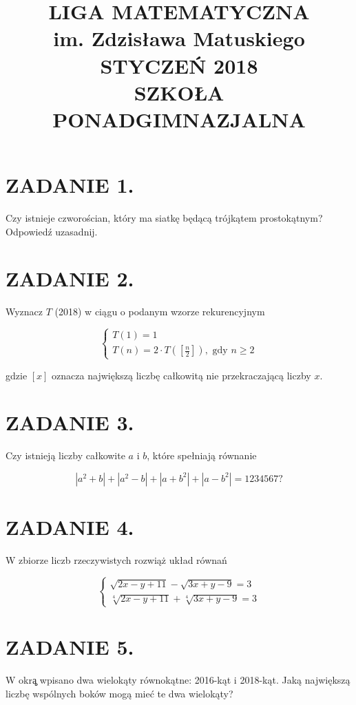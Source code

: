 \documentclass[10pt]{article}
\title{LIGA MATEMATYCZNA \\
 im. Zdzisława Matuskiego \\
 STYCZEŃ 2018 \\
 SZKOŁA PONADGIMNAZJALNA }
\author{}
\date{}
\begin{document}
\maketitle
\section*{ZADANIE 1.}
Czy istnieje czworościan, który ma siatkę będącą trójkątem prostokątnym? Odpowiedź uzasadnij.

\section*{ZADANIE 2.}
Wyznacz \(T\) (2018) w ciągu o podanym wzorze rekurencyjnym

\[
\left\{\begin{array}{l}
T(1)=1 \\
T(n)=2 \cdot T\left(\left[\frac{n}{2}\right]\right), \text { gdy } n \geqslant 2
\end{array}\right.
\]

gdzie \([x]\) oznacza największą liczbę całkowitą nie przekraczającą liczby \(x\).

\section*{ZADANIE 3.}
Czy istnieją liczby całkowite \(a\) i \(b\), które spełniają równanie

\[
\left|a^{2}+b\right|+\left|a^{2}-b\right|+\left|a+b^{2}\right|+\left|a-b^{2}\right|=1234567 ?
\]

\section*{ZADANIE 4.}
W zbiorze liczb rzeczywistych rozwiąż układ równań

\[
\left\{\begin{array}{l}
\sqrt{2 x-y+11}-\sqrt{3 x+y-9}=3 \\
\sqrt[4]{2 x-y+11}+\sqrt[4]{3 x+y-9}=3
\end{array}\right.
\]

\section*{ZADANIE 5.}
W okrą̧ wpisano dwa wielokąty równokątne: 2016-kąt i 2018-kąt. Jaką największą liczbę wspólnych boków mogą mieć te dwa wielokąty?
\end{document}
